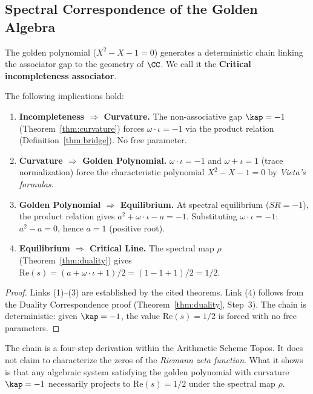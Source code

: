 \subsection{Spectral Correspondence of the Golden Algebra}

The golden polynomial ($X^2 - X - 1 = 0$) generates a deterministic chain linking the associator gap to the geometry of $\CC$. We call it the \textbf{Critical incompleteness associator}.

\begin{theorem}\label{thm:spectral-chain}
The following implications hold:
\begin{enumerate}
\item \textbf{Incompleteness $\Rightarrow$ Curvature.} The non-associative gap $\kap = -1$ (Theorem~\ref{thm:curvature}) forces $\omega \cdot \iota = -1$ via the product relation (Definition~\ref{thm:bridge}). No free parameter.
\item \textbf{Curvature $\Rightarrow$ Golden Polynomial.} $\omega \cdot \iota = -1$ and $\omega + \iota = 1$ (trace normalization) force the characteristic polynomial $X^2 - X - 1 = 0$ by \emph{Vieta's formulas}.
\item \textbf{Golden Polynomial $\Rightarrow$ Equilibrium.} At spectral equilibrium ($SR = -1$), the product relation gives $a^2 + \omega \cdot \iota - a = -1$. Substituting $\omega \cdot \iota = -1$: $a^2 - a = 0$, hence $a = 1$ (positive root).
\item \textbf{Equilibrium $\Rightarrow$ Critical Line.} The spectral map $\rho$ (Theorem~\ref{thm:duality}) gives $\mathrm{Re}(s) = (a + \omega \cdot \iota + 1)/2 = (1 - 1 + 1)/2 = 1/2$.
\end{enumerate}
\end{theorem}

\begin{proof}
Links (1)--(3) are established by the cited theorems. Link (4) follows from the Duality Correspondence proof (Theorem~\ref{thm:duality}, Step~3). The chain is deterministic: given $\kap = -1$, the value $\mathrm{Re}(s) = 1/2$ is forced with no free parameters. \qedhere
\end{proof}

\begin{remark}
The chain is a four-step derivation within the Arithmetic Scheme Topos. It does not claim to characterize the zeros of the \emph{Riemann zeta function}. What it shows is that any algebraic system satisfying the golden polynomial with curvature $\kap = -1$ necessarily projects to $\mathrm{Re}(s) = 1/2$ under the spectral map $\rho$.
\end{remark}


